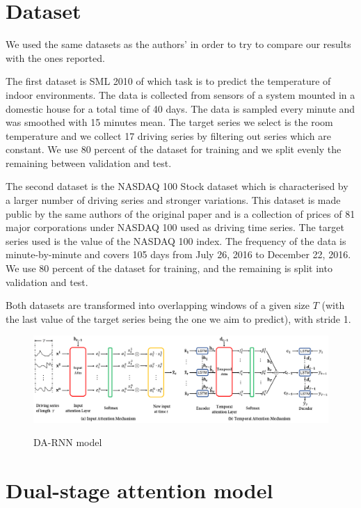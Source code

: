 \documentclass{article}
\begin{document}
\section{Dataset}
\label{sec:retrieval}

We used the same datasets as the authors' in order to try to compare our results
with the ones reported.

The first dataset is SML 2010 of which task is to predict the temperature of indoor 
environments. The data is collected from sensors of a system mounted in a 
domestic house for a total time of 40 days. The data is sampled every minute and 
was smoothed with 15 minutes mean. The target series we select is the room 
temperature and we collect 17 driving series by filtering out series which
are constant. We use $80$ percent of the dataset for training and we 
split evenly the remaining between validation and test.

The second dataset is the NASDAQ 100 Stock dataset which is characterised by a
larger number of driving series and stronger variations. This dataset is
made public by the same
authors of the original paper and is a collection of prices of 81 major
corporations under NASDAQ 100 used as driving time series. The target series
used is the value of the NASDAQ 100 index. The frequency of the data is 
minute-by-minute and covers 105 days from July 26, 2016 to December 22, 2016. 
We use $80$ percent of the dataset for training, and the remaining is split into 
validation and test.

Both datasets are transformed into overlapping windows of a given size
$T$ (with the last value of the target series being the one we aim to predict), with stride 1.

\begin{figure}[h]
\centering
\includegraphics[width=\linewidth]{da-rnn.png} \\
\caption{DA-RNN model}

\label{fig:da-rnn}
\end{figure}


\section{Dual-stage attention model}
\label{sec:da-rnn}
\end{document}
